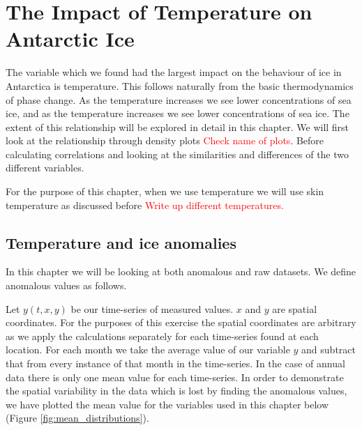 \documentclass[../main.tex]{subfiles}
\begin{document}
\chapter[Temperature and Ice]{The Impact of Temperature on Antarctic Ice}

The variable which we found had the largest impact on the behaviour of ice in Antarctica is temperature. This follows naturally from the basic thermodynamics of phase change. As the temperature increases we see lower concentrations of sea ice, and as the temperature increases we see lower concentrations of sea ice. The extent of this relationship will be explored in detail in this chapter. We will first look at the relationship through density plots \textcolor{red}{Check name of plots}. Before calculating correlations and looking at the similarities and differences of the two different variables.

For the purpose of this chapter, when we use temperature we will use skin temperature as discussed before \textcolor{red}{Write up different temperatures.}

\section{Temperature and ice anomalies}
In this chapter we will be looking at both anomalous and raw datasets. We define anomalous values as follows.

Let $y(t,x,y)$ be our time-series of measured values. $x$ and $y$ are spatial coordinates. For the purposes of this exercise the spatial coordinates are arbitrary as we apply the calculations separately for each time-series found at each location. For each month we take the average value of our variable $y$ and subtract that from every instance of that month in the time-series. In the case of annual data there is only one mean value for each time-series. In order to demonstrate the spatial variability in the data which is lost by finding the anomalous values, we have plotted the mean value for the variables used in this chapter below (Figure \ref{fig:mean_distributions}).
\end{document}
